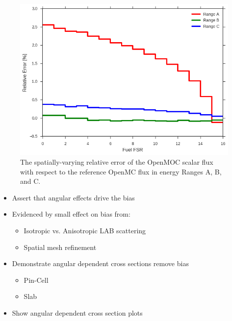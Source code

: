 \begin{figure}[H]
\centering
\includegraphics[width=0.8\linewidth]{figures/rel-err-fuel-fsrs}
\caption{The spatially-varying relative error of the OpenMOC scalar flux with respect to the reference OpenMC flux in energy Ranges A, B, and C.}
\label{fig:rel-err-space}
\end{figure}

\begin{itemize}
\item Assert that angular effects drive the bias
\item Evidenced by small effect on bias from:
\begin{itemize}
\item Isotropic vs. Anisotropic LAB scattering
\item Spatial mesh refinement
\end{itemize}
\item Demonstrate angular dependent cross sections remove bias
\begin{itemize}
\item Pin-Cell
\item Slab
\end{itemize}
\item Show angular dependent cross section plots
\end{itemize}
